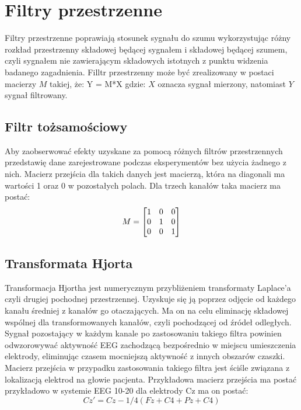\documentclass[licencjacka,openright]{pracamgr}
\begin{document}
\section{Filtry przestrzenne}
Filtry przestrzenne poprawiają stosunek sygnału do szumu wykorzystując różny rozkład przestrzenny składowej będącej sygnałem i składowej będącej szumem, czyli sygnałem nie zawierającym składowych istotnych z punktu widzenia badanego zagadnienia.
Filltr przestrzenny może być zrealizowany w postaci macierzy $M$ takiej, że: 
Y = M*X
gdzie: $X$ oznacza sygnał mierzony, natomiast $Y$ sygnał filtrowany.


\subsection{Filtr tożsamościowy}
Aby zaobserwować efekty uzyskane za pomocą różnych filtrów przestrzennych przedstawię dane zarejestrowane podczas eksperymentów bez użycia żadnego z nich. Macierz przejścia dla takich danych jest macierzą, która na diagonali ma wartości 1 oraz 0 w pozostałych polach.
Dla trzech kanałów taka macierz ma postać:
\[
M =
\begin{bmatrix}
  $1$ & $0$ & $0$ \\
  $0$ & $1$ & $0$ \\
  $0$ & $0$ & $1$ 
\end{bmatrix}
\]

\subsection{Transformata Hjorta}
Transformacja Hjortha jest numerycznym przybliżeniem transformaty Laplace'a czyli drugiej pochodnej przestrzennej. Uzyskuje się ją poprzez odjęcie od każdego kanału średniej z kanałów go otaczających. Ma on na celu eliminację składowej wspólnej dla transformowanych kanałów, czyli pochodzącej od źródeł odległych. Sygnał pozostający w każdym kanale po zastosowaniu takiego filtra powinien odwzorowywać aktywność EEG zachodzącą bezpośrednio w miejscu umieszczenia elektrody, eliminując czasem mocniejszą aktywność z innych obszarów czaszki.
Macierz przejścia w przypadku zastosowania takiego filtra jest ściśle związana z lokalizacją elektrod na głowie pacjenta.
Przykładowa macierz przejścia ma postać przykładowo w systemie EEG 10-20 dla elektrody Cz ma on postać:
\begin{equation}
Cz' = Cz - 1/4(Fz+C4+Pz+C4)
\end{equation}
\end{document}
